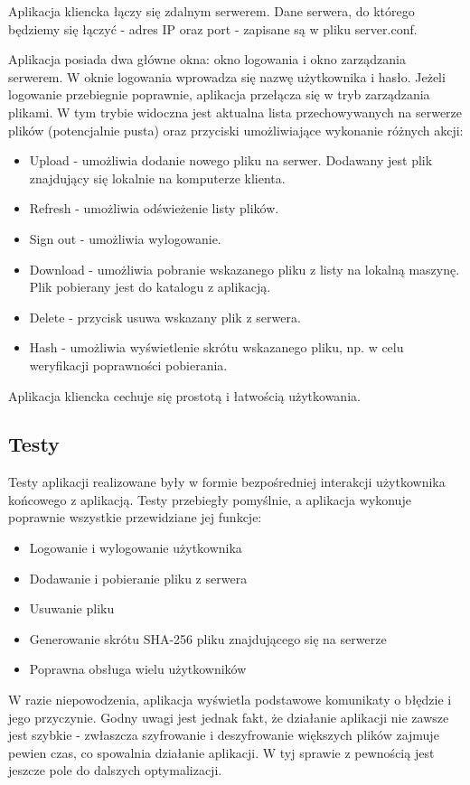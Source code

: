 \documentclass{article}
\begin{document}
	Aplikacja kliencka łączy się zdalnym serwerem. Dane serwera, do którego będziemy się łączyć - adres IP oraz port - zapisane są w pliku server.conf. 
	
	Aplikacja posiada dwa główne okna: okno logowania i okno zarządzania serwerem. W oknie logowania wprowadza się nazwę użytkownika i hasło. Jeżeli logowanie przebiegnie poprawnie, aplikacja przełącza się w tryb zarządzania plikami. W tym trybie widoczna jest aktualna lista przechowywanych na serwerze plików (potencjalnie pusta) oraz przyciski umożliwiające wykonanie różnych akcji:
	\begin{itemize}
		\item Upload - umożliwia dodanie nowego pliku na serwer. Dodawany jest plik znajdujący się lokalnie na komputerze klienta. 
		\item Refresh - umożliwia odświeżenie listy plików. 
		\item Sign out - umożliwia wylogowanie. 
		\item Download - umożliwia pobranie wskazanego pliku z listy na lokalną maszynę. Plik pobierany jest do katalogu z aplikacją. 
		\item Delete - przycisk usuwa wskazany plik z serwera. 
		\item Hash - umożliwia wyświetlenie skrótu wskazanego pliku, np. w celu weryfikacji poprawności pobierania. 
	\end{itemize}
	
	Aplikacja kliencka cechuje się prostotą i łatwością użytkowania. 
	
	\subsection{Testy}
	Testy aplikacji realizowane były w formie bezpośredniej interakcji użytkownika końcowego z aplikacją. Testy przebiegły pomyślnie, a aplikacja wykonuje poprawnie wszystkie przewidziane jej funkcje:
	\begin{itemize}
		\item Logowanie i wylogowanie użytkownika
		\item Dodawanie i pobieranie pliku z serwera
		\item Usuwanie pliku
		\item Generowanie skrótu SHA-256 pliku znajdującego się na serwerze
		\item Poprawna obsługa wielu użytkowników
	\end{itemize}

	W razie niepowodzenia, aplikacja wyświetla podstawowe komunikaty o błędzie i jego przyczynie. Godny uwagi jest jednak fakt, że działanie aplikacji nie zawsze jest szybkie - zwłaszcza szyfrowanie i deszyfrowanie większych plików zajmuje pewien czas, co spowalnia działanie aplikacji. W tyj sprawie z pewnością jest jeszcze pole do dalszych optymalizacji. 
	
	
	

	
\end{document}

